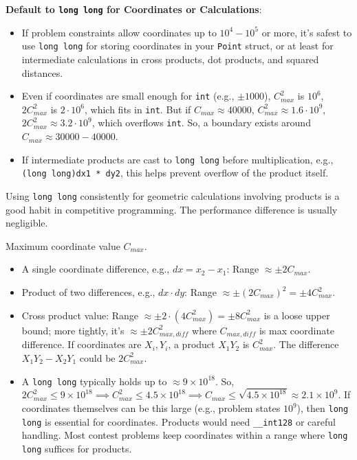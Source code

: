 \begin{tipsbox}
\label{tips:A.3.2.use_long_long}
\textbf{Default to \texttt{long long} for Coordinates or Calculations}:
\begin{itemize}
    \item If problem constraints allow coordinates up to $10^4 - 10^5$ or more, it's safest to use \texttt{long long} for storing coordinates in your \texttt{Point} struct, or at least for intermediate calculations in cross products, dot products, and squared distances.
    \item Even if coordinates are small enough for \texttt{int} (e.g., $\pm 1000$), $C_{max}^2$ is $10^6$, $2 C_{max}^2$ is $2 \cdot 10^6$, which fits in \texttt{int}. But if $C_{max} \approx 40000$, $C_{max}^2 \approx 1.6 \cdot 10^9$, $2 C_{max}^2 \approx 3.2 \cdot 10^9$, which overflows \texttt{int}. So, a boundary exists around $C_{max} \approx 30000 - 40000$.
    \item If intermediate products are cast to \texttt{long long} before multiplication, e.g., \texttt{(long long)dx1 * dy2}, this helps prevent overflow of the product itself.
\end{itemize}
Using \texttt{long long} consistently for geometric calculations involving products is a good habit in competitive programming. The performance difference is usually negligible.
\end{tipsbox}

\begin{mathinsight}
\label{mathinsight:A.3.2.overflow_check}
Maximum coordinate value $C_{max}$.
\begin{itemize}
    \item A single coordinate difference, e.g., $dx = x_2-x_1$: Range $\approx \pm 2 C_{max}$.
    \item Product of two differences, e.g., $dx \cdot dy$: Range $\approx \pm (2 C_{max})^2 = \pm 4 C_{max}^2$.
    \item Cross product value: Range $\approx \pm 2 \cdot (4 C_{max}^2) = \pm 8 C_{max}^2$ is a loose upper bound; more tightly, it's $\approx \pm 2 C_{max,diff}^2$ where $C_{max,diff}$ is max coordinate difference. If coordinates are $X_i, Y_i$, a product $X_1 Y_2$ is $C_{max}^2$. The difference $X_1 Y_2 - X_2 Y_1$ could be $2 C_{max}^2$.
    \item A \texttt{long long} typically holds up to $\approx 9 \times 10^{18}$. So, $2 C_{max}^2 \le 9 \times 10^{18} \implies C_{max}^2 \le 4.5 \times 10^{18} \implies C_{max} \le \sqrt{4.5 \times 10^{18}} \approx 2.1 \times 10^9$.
    If coordinates themselves can be this large (e.g., problem states $10^9$), then \texttt{long long} is essential for coordinates. Products would need \texttt{\_\_int128} or careful handling. Most contest problems keep coordinates within a range where \texttt{long long} suffices for products.
\end{itemize}
\end{mathinsight}

